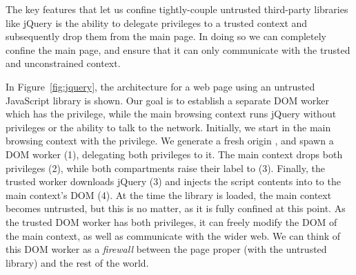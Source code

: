 The key features that let us confine tightly-couple untrusted
third-party libraries like jQuery is the ability to delegate
privileges to a trusted context and subsequently drop them from the
main page. In doing so we can completely confine the main page, and
ensure that it can only communicate with the trusted and unconstrained
context.

In Figure~\ref{fig:jquery}, the architecture for a web page using an
untrusted JavaScript library is shown.  Our goal is to establish a
separate DOM worker which has the  privilege, while the
main browsing context runs jQuery without privileges or the ability to
talk to the network.  Initially, we start in the main browsing context
with the  privilege.  We generate a fresh origin
, and spawn a DOM worker (1), delegating both privileges to it.  The
main context drops both privileges (2), while both compartments raise
their label to  (3).  Finally, the
trusted worker downloads jQuery (3) and injects the script contents
into to the main context's DOM (4).  At the time the library
is loaded, the main context becomes untrusted, but this is no matter, as
it is fully confined at this point.  As the trusted DOM worker has both
privileges, it can freely modify the DOM of the main context, as well as
communicate with the wider web.  We can think of this DOM worker as a
\emph{firewall} between the page proper (with the untrusted library)
and the rest of the world.

